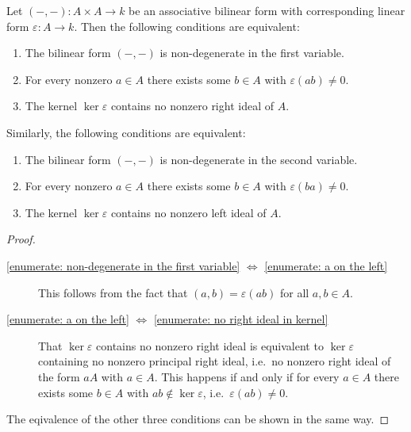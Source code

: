 \begin{lemma}
  \label{proposition: nondegenerate for linear forms}
  Let $(-,-) \colon A \times A \to k$ be an associative bilinear form with corresponding linear form $\varepsilon \colon A \to k$.
  Then the following conditions are equivalent:
  \begin{enumerate}
    \item
      \label{enumerate: non-degenerate in the first variable}
      The bilinear form $(-,-)$ is non-degenerate in the first variable.
    \item
      \label{enumerate: a on the left}
      For every nonzero $a \in A$ there exists some $b \in A$ with $\varepsilon(ab) \neq 0$.
    \item
      \label{enumerate: no right ideal in kernel}
      The kernel $\ker \varepsilon$ contains no nonzero right ideal of $A$.
  \end{enumerate}
  Similarly, the following conditions are equivalent:
  \begin{enumerate}
    \item
      The bilinear form $(-,-)$ is non-degenerate in the second variable.
    \item
      For every nonzero $a \in A$ there exists some $b \in A$ with $\varepsilon(ba) \neq 0$.
    \item
      The kernel $\ker \varepsilon$ contains no nonzero left ideal of $A$.
  \end{enumerate}
\end{lemma}


\begin{proof}
  \leavevmode
  \begin{description}
    \item[\ref*{enumerate: non-degenerate in the first variable} $\iff$ \ref*{enumerate: a on the left}]
      This follows from the fact that $(a,b) = \varepsilon(ab)$ for all $a, b \in A$.
    \item[\ref*{enumerate: a on the left} $\iff$ \ref*{enumerate: no right ideal in kernel}]
      That $\ker \varepsilon $ contains no nonzero right ideal is equivalent to $\ker \varepsilon $ containing no nonzero principal right ideal, i.e.\ no nonzero right ideal of the form $a A$ with $a \in A$.
      This happens if and only if for every $a \in A$ there exists some $b \in A$ with $ab \notin \ker \varepsilon$, i.e.\ $\varepsilon(ab) \neq 0$.
  \end{description}
  The eqivalence of the other three conditions can be shown in the same way.
\end{proof}



